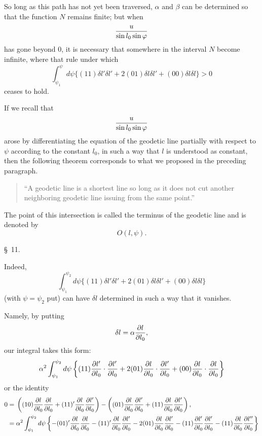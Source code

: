 So long as this path has not yet been traversed, $\alpha$ and $\beta$ can be determined so that the function $N$ remains finite; but when
\[
 {u\over \sin l_0\sin\varphi}
\]
has gone beyond $0$, it is necessary that somewhere in the interval $N$ become infinite, where that rule under which
\[
 \int_{\psi_1}^{\psi}d\psi\{(11)\delta l'\delta l'+2(01)\delta l\delta l'+(00)\delta l\delta l\}>0
\]
ceases to hold.

If we recall that
\[
 {u\over \sin l_0\sin\varphi}
\]
arose by differentiating the equation of the geodetic line partially with respect to $\psi$ according to the constant $l_0$, in such a way that $l$ is understood as constant, then the following theorem corresponds to what we proposed in the preceding paragraph.

\begin{quote}
``A geodetic line is a shortest line so long as it does not cut another neighboring geodetic line issuing from the same point.''
\end{quote}

The point of this intersection is called the terminus of the geodetic line and is denoted by
\[
 O(l,\psi).
\]

\begin{center}\S\ 11.\end{center}

Indeed,
\[
 \int_{\psi_1}^{\psi_2}d\psi\{(11)\delta l'\delta l'+2(01)\delta l\delta l'+(00)\delta l\delta l\}
\]
(with $\psi=\psi_2$ put) can have $\delta l$ determined in such a way that it vanishes.

Namely, by putting
\[
 \delta l=\alpha{\partial l\over \partial l_0},
\]
our integral takes this form:
\[
 \alpha^2\int_{\psi_1}^{\psi_2}d\psi\left\{(11){\partial l'\over \partial l_0}\cdot{\partial l'\over \partial l_0}
 +2(01){\partial l\over \partial l_0}\cdot{\partial l'\over \partial l_0}
 +(00){\partial l\over \partial l_0}\cdot{\partial l\over \partial l_0}\right\}
\]
or the identity
\[
\begin{aligned}
0={}&\left((10){\partial l\over \partial l_0}{\partial l\over \partial l_0}+(11)'{\partial l\over \partial l_0}{\partial l'\over \partial l_0}\right)
-\left((01){\partial l\over \partial l_0}{\partial l'\over \partial l_0}+(11){\partial l\over \partial l_0}{\partial l'\over \partial l_0}\right),\\
={}&\alpha^2\int_{\psi_1}^{\psi_2}d\psi\left\{-(01)'{\partial l\over \partial l_0}{\partial l\over \partial l_0}
-(11)'{\partial l\over \partial l_0}{\partial l'\over \partial l_0}
-2(01){\partial l\over \partial l_0}{\partial l'\over \partial l_0}
-(11){\partial l'\over \partial l_0}{\partial l'\over \partial l_0}
-(11){\partial l\over \partial l_0}{\partial l''\over \partial l_0}\right\}
\end{aligned}
\]
